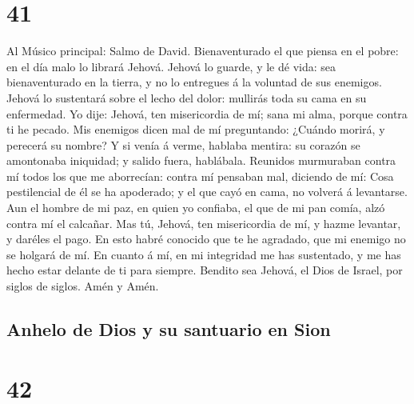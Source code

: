 \hypertarget{section-40}{%
\section{41}\label{section-40}}

 Al Músico principal: Salmo de David. Bienaventurado el
que piensa en el pobre: en el día malo lo librará Jehová. 
Jehová lo guarde, y le dé vida: sea bienaventurado en la tierra, y no lo
entregues á la voluntad de sus enemigos.  Jehová lo
sustentará sobre el lecho del dolor: mullirás toda su cama en su
enfermedad.  Yo dije: Jehová, ten misericordia de mí; sana
mi alma, porque contra ti he pecado.  Mis enemigos dicen
mal de mí preguntando: ¿Cuándo morirá, y perecerá su nombre?
 Y si venía á verme, hablaba mentira: su corazón se
amontonaba iniquidad; y salido fuera, hablábala.  Reunidos
murmuraban contra mí todos los que me aborrecían: contra mí pensaban
mal, diciendo de mí:  Cosa pestilencial de él se ha
apoderado; y el que cayó en cama, no volverá á levantarse.
 Aun el hombre de mi paz, en quien yo confiaba, el que de
mi pan comía, alzó contra mí el calcañar.  Mas tú,
Jehová, ten misericordia de mí, y hazme levantar, y daréles el pago.
 En esto habré conocido que te he agradado, que mi
enemigo no se holgará de mí.  En cuanto á mí, en mi
integridad me has sustentado, y me has hecho estar delante de ti para
siempre.  Bendito sea Jehová, el Dios de Israel, por
siglos de siglos. Amén y Amén.

\hypertarget{anhelo-de-dios-y-su-santuario-en-sion}{%
\subsection{Anhelo de Dios y su santuario en
Sion}\label{anhelo-de-dios-y-su-santuario-en-sion}}

\hypertarget{section-41}{%
\section{42}\label{section-41}}

